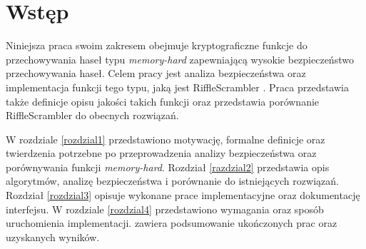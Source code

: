 \chapter{Wstęp}
\thispagestyle{chapterBeginStyle}


Niniejsza praca swoim zakresem obejmuje kryptograficzne funkcje do przechowywania haseł typu \textit{memory-hard} zapewniającą wysokie bezpieczeństwo przechowywania haseł.
Celem pracy jest analiza bezpieczeństwa oraz implementacja funkcji tego typu, jaką jest RiffleScrambler \cite{rs}. Praca przedstawia także definicje opisu jakości takich funkcji oraz przedstawia porównanie RiffleScrambler do obecnych rozwiązań.

W rozdziale \ref{rozdzial1} przedstawiono motywację, formalne definicje oraz twierdzenia potrzebne po przeprowadzenia analizy bezpieczeństwa oraz porównywania funkcji \textit{memory-hard}.
Rozdział \ref{razdzial2} przedstawia opis algorytmów, analizę bezpieczeństwa i porównanie do istniejących rozwiązań.
Rozdział \ref{rozdzial3} opisuje wykonane prace implementacyjne oraz dokumentację interfejsu.
W rozdziale \ref{rozdzial4} przedstawiono wymagania oraz sposób uruchomienia implementacji.
 zawiera podsumowanie ukończonych prac oraz uzyskanych wyników.

